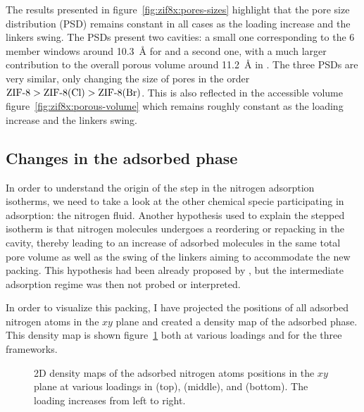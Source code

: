 \documentclass[thesis]{subfiles}
\begin{document}
The results presented in figure~\ref{fig:zif8x:pores-sizes} highlight that the
pore size distribution (PSD) remains constant in all cases as the loading
increase and the linkers swing. The PSDs present two cavities: a small one
corresponding to the 6 member windows around \SI{10.3}{\AA} for  and a
second one, with a much larger contribution to the overall porous volume around
\SI{11.2}{\AA} in . The three PSDs are very similar, only changing the size
of pores in the order $\text{\ZIF8} > \text{\ZIFCl} > \text{\ZIFBr}$. This is
also reflected in the accessible volume figure~\ref{fig:zif8x:porous-volume}
which remains roughly constant as the loading increase and the linkers swing.

\subsection{Changes in the adsorbed phase}

In order to understand the origin of the step in the nitrogen adsorption
isotherms, we need to take a look at the other chemical specie participating in
adsorption: the nitrogen fluid. Another hypothesis used to explain the stepped
isotherm is that nitrogen molecules undergoes a reordering or repacking in the
cavity, thereby leading to an increase of adsorbed molecules in the same total
pore volume as well as the swing of the linkers aiming to accommodate the new
packing. This hypothesis had been already proposed by
\citeauthor{Ania2012}\cite{Ania2012}, but the intermediate adsorption regime was
then not probed or interpreted.

In order to visualize this packing, I have projected the positions of all
adsorbed nitrogen atoms in the $xy$ plane and created a density map of the
adsorbed phase. This density map is shown figure~\ref{fig:zif8x:density} both at
various loadings and for the three frameworks.

\begin{figure}[ht]
    \centering
    \TODO
    \caption{2D density maps of the adsorbed nitrogen atoms positions in the $xy$
    plane at various loadings in  (top), \ZIFCl (middle), and \ZIFBr
    (bottom). The loading increases from left to right.}
    \label{fig:zif8x:density}
\end{figure}
\end{document}
